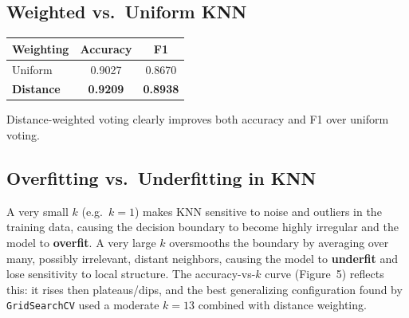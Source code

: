 \documentclass[11pt]{article}
\begin{document}
\subsection{Weighted vs.\ Uniform KNN}
\begin{table}[H]
\centering
\begin{tabular}{lcc}
\toprule
\textbf{Weighting} & \textbf{Accuracy} & \textbf{F1} \\
\midrule
Uniform   & 0.9027 & 0.8670 \\
\textbf{Distance}  & \textbf{0.9209} & \textbf{0.8938} \\
\bottomrule
\end{tabular}
\end{table}
Distance-weighted voting clearly improves both accuracy and F1 over uniform voting.

\subsection{Overfitting vs.\ Underfitting in KNN}
A very small $k$ (e.g.\ $k=1$) makes KNN sensitive to noise and outliers in the
training data, causing the decision boundary to become highly irregular and the model
to \textbf{overfit}. A very large $k$ oversmooths the boundary by averaging over many,
possibly irrelevant, distant neighbors, causing the model to \textbf{underfit} and lose
sensitivity to local structure. The accuracy-vs-$k$ curve (Figure~5) reflects this: it
rises then plateaus/dips, and the best generalizing configuration found by
\texttt{GridSearchCV} used a moderate $k=13$ combined with distance weighting.
\end{document}
